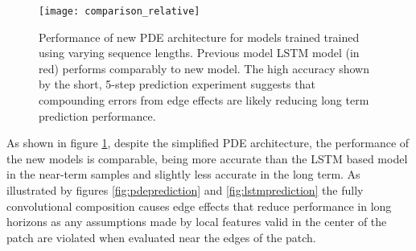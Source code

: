 \documentclass[12pt]{article}
\theoremstyle{plain}
\theoremstyle{remark}
\theoremstyle{definition}
\begin{document}
\begin{figure}
	\centering
	\texttt{[image: comparison\_relative]}
	\caption{\small Performance of new PDE architecture for models trained trained using varying sequence lengths. Previous model LSTM model (in red) performs comparably to new model. The high accuracy shown by the short, 5-step prediction experiment suggests that compounding errors from edge effects are likely reducing long term prediction performance.}
	\label{fig:pdeperf}
\end{figure}



As shown in figure \ref{fig:pdeperf}, despite the simplified PDE architecture, the performance of the new models is comparable, being more accurate than the LSTM based model in the near-term samples and slightly less accurate in the long term. As illustrated by figures \ref{fig:pdeprediction} and \ref{fig:lstmprediction} the fully convolutional composition causes edge effects that reduce performance in long horizons as any assumptions made by local features valid in the center of the patch are violated when evaluated near the edges of the patch.
\end{document}
